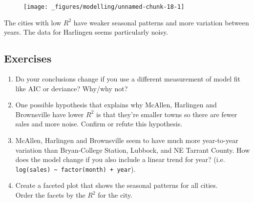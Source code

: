 \begin{Shaded}
\end{Shaded}

\begin{figure}[H]
  \centering
  \texttt{[image: \_figures/modelling/unnamed-chunk-18-1]}
\end{figure}

The cities with low \(R^2\) have weaker seasonal patterns and more
variation between years. The data for Harlingen seems particularly
noisy.

\hypertarget{exercises-2}{%
\subsection{Exercises}\label{exercises-2}}

\begin{enumerate}
\def\labelenumi{\arabic{enumi}.}
\item
  Do your conclusions change if you use a different measurement of model
  fit like AIC or deviance? Why/why not?
\item
  One possible hypothesis that explains why McAllen, Harlingen and
  Brownsville have lower \(R^2\) is that they're smaller towns so there
  are fewer sales and more noise. Confirm or refute this hypothesis.
\item
  McAllen, Harlingen and Brownsville seem to have much more year-to-year
  variation than Bryan-College Station, Lubbock, and NE Tarrant County.
  How does the model change if you also include a linear trend for year?
  (i.e. \texttt{log(sales)\ \textasciitilde{}\ factor(month)\ +\ year}).
\item
  Create a faceted plot that shows the seasonal patterns for all
  cities.\\
  Order the facets by the \(R^2\) for the city.
\end{enumerate}

